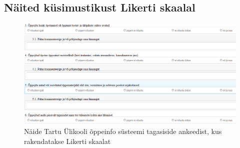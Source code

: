\documentclass[a4paper,12pt,oneside]{article}
\numberwithin{equation}{section}
\theoremstyle{definition}
\begin{document}
\begin{subappendices}
\subsection{Näited küsimustikust Likerti skaalal}


\begin{figure}[H]
\centering
\includegraphics[width=1\textwidth]{ois_tagasiside_toodeldud.png}
\caption{Näide Tartu \"Ulikooli õppeinfo s\"usteemi tagasiside ankeedist, kus rakendatakse Likerti skaalat \cite{UT}}
\label{likert1}
\end{figure}


\end{subappendices}
\end{document}
